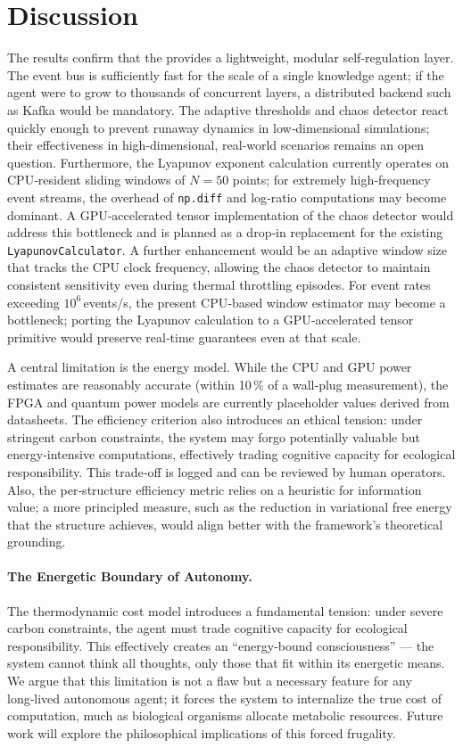 \section{Discussion}

The results confirm that the \Core{} provides a lightweight, modular
self‑regulation layer.  The event bus is sufficiently fast for the
scale of a single knowledge agent; if the agent were to grow to
thousands of concurrent layers, a distributed backend such as Kafka
would be mandatory.  The adaptive thresholds and chaos detector react
quickly enough to prevent runaway dynamics in low‑dimensional
simulations; their effectiveness in high‑dimensional, real‑world
scenarios remains an open question. Furthermore, the Lyapunov exponent calculation currently operates on
CPU‑resident sliding windows of $N=50$ points; for extremely high‑frequency
event streams, the overhead of \texttt{np.diff} and log‑ratio computations
may become dominant.  A GPU‑accelerated tensor implementation of the
chaos detector would address this bottleneck and is planned as a
drop‑in replacement for the existing \texttt{LyapunovCalculator}.
A further enhancement would be an adaptive window size that tracks
the CPU clock frequency, allowing the chaos detector to maintain
consistent sensitivity even during thermal throttling episodes.
For event rates exceeding $10^6$\,events/s, the present CPU‑based
window estimator may become a bottleneck; porting the Lyapunov
calculation to a GPU‑accelerated tensor primitive would preserve
real‑time guarantees even at that scale.

A central limitation is the energy model.  While the CPU and GPU power
estimates are reasonably accurate (within 10\,\% of a wall‑plug
measurement), the FPGA and quantum power models are currently
placeholder values derived from datasheets.  The efficiency criterion also introduces an ethical tension: under
stringent carbon constraints, the system may forgo potentially valuable
but energy‑intensive computations, effectively trading cognitive
capacity for ecological responsibility.  This trade‑off is logged and
can be reviewed by human operators. Also, the per‑structure
efficiency metric relies on a heuristic for information value; a more
principled measure, such as the reduction in variational free energy
that the structure achieves, would align better with the \Apeiron{}
framework’s theoretical grounding.

\paragraph{The Energetic Boundary of Autonomy.}
The thermodynamic cost model introduces a fundamental tension: under severe carbon 
constraints, the agent must trade cognitive capacity for ecological responsibility.  
This effectively creates an “energy‑bound consciousness” — the system cannot think 
all thoughts, only those that fit within its energetic means.  
We argue that this limitation is not a flaw but a necessary feature for any 
long‑lived autonomous agent; it forces the system to internalize the true cost of 
computation, much as biological organisms allocate metabolic resources.  
Future work will explore the philosophical implications of this forced frugality.


